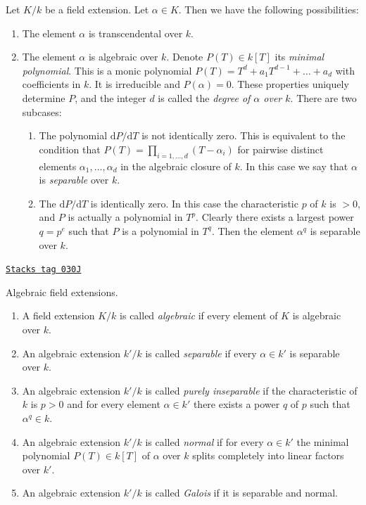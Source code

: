 \medskip\noindent
Let $K/k$ be a field extension. Let $\alpha \in K$. Then we have the
following possibilities:
\begin{enumerate}
\item The element $\alpha$ is transcendental over $k$.
\item The element $\alpha$ is algebraic over $k$. Denote
$P(T) \in k[T]$ its {\it minimal polynomial}. This is a monic polynomial
$P(T) = T^d + a_1 T^{d - 1} + \ldots + a_d$ with coefficients in
$k$. It is irreducible and $P(\alpha) = 0$. These properties
uniquely determine $P$, and the integer $d$ is called the
{\it degree of $\alpha$ over $k$}. There are two subcases:
\begin{enumerate}
\item The polynomial $\text{d}P/\text{d}T$ is not identically zero.
This is equivalent to the condition that
$P(T) = \prod_{i = 1, \ldots, d} (T - \alpha_i)$ for
pairwise distinct elements $\alpha_1, \ldots, \alpha_d$
in the algebraic closure of $k$.
In this case we say that $\alpha$ is {\it separable} over $k$.
\item The $\text{d}P/\text{d}T$ is identically zero. In this case the
characteristic $p$ of $k$ is $ > 0$, and $P$ is actually a polynomial
in $T^p$. Clearly there exists a largest power $q = p^e$ such that $P$ is
a polynomial in $T^q$. Then the element $\alpha^q$ is separable over $k$.
\end{enumerate}
\end{enumerate}

\begin{definition}
\label{fields-definition-separable-algebraic}
\href{https://stacks.math.columbia.edu/tag/030J}{\texttt{Stacks tag 030J}}

Algebraic field extensions.
\begin{enumerate}
\item A field extension $K/k$ is called {\it algebraic}
if every element of $K$ is algebraic over $k$.
\item An algebraic extension $k'/k$ is called {\it separable}
if every $\alpha \in k'$ is separable over $k$.
\item An algebraic
extension $k'/k$ is called {\it purely inseparable} if
the characteristic of $k$ is $p > 0$ and for every element
$\alpha \in k'$ there exists a power $q$ of $p$ such that
$\alpha^q \in k$.
\item An algebraic extension $k'/k$ is called {\it normal}
if for every $\alpha \in k'$ the minimal polynomial $P(T) \in k[T]$
of $\alpha$ over $k$ splits completely into linear factors over $k'$.
\item An algebraic extension $k'/k$ is called {\it Galois}
if it is separable and normal.
\end{enumerate}
\end{definition}

